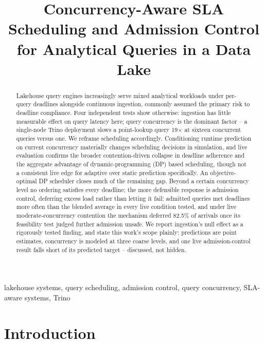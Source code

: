\documentclass[conference]{IEEEtran}
\begin{document}
\title{Concurrency-Aware SLA Scheduling and Admission Control for Analytical Queries in a Data Lake}

\author{
}

\maketitle

\begin{abstract}
Lakehouse query engines increasingly serve mixed analytical workloads under per-query deadlines alongside continuous ingestion, commonly assumed the primary risk to deadline compliance. Four independent tests show otherwise: ingestion has little measurable effect on query latency here; query concurrency is the dominant factor -- a single-node Trino deployment slows a point-lookup query 19$\times$ at sixteen concurrent queries versus one. We reframe scheduling accordingly. Conditioning runtime prediction on current concurrency materially changes scheduling decisions in simulation, and live evaluation confirms the broader contention-driven collapse in deadline adherence and the aggregate advantage of dynamic-programming (DP) based scheduling, though not a consistent live edge for adaptive over static prediction specifically. An objective-optimal DP scheduler closes much of the remaining gap. Beyond a certain concurrency level no ordering satisfies every deadline; the more defensible response is admission control, deferring excess load rather than letting it fail: admitted queries met deadlines more often than the blended average in every live condition tested, and under live moderate-concurrency contention the mechanism deferred 82.5\% of arrivals once its feasibility test judged further admission unsafe. We report ingestion's null effect as a rigorously tested finding, and state this work's scope plainly: predictions are point estimates, concurrency is modeled at three coarse levels, and one live admission-control result falls short of its predicted target -- discussed, not hidden.
\end{abstract}

\begin{IEEEkeywords}
lakehouse systems, query scheduling, admission control, query concurrency, SLA-aware systems, Trino
\end{IEEEkeywords}

\IEEEpeerreviewmaketitle

\section{Introduction}
\end{document}
